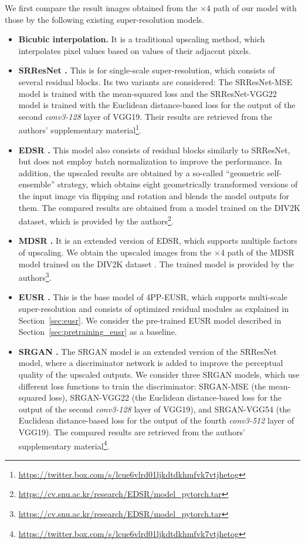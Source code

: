 \documentclass[runningheads]{llncs}
\begin{document}
We first compare the result images obtained from the $\times$4 path of our model with those by the following existing super-resolution models.
\begin{itemize}
	\item \textbf{Bicubic interpolation.}
	It is a traditional upscaling method, which interpolates pixel values based on values of their adjacent pixels.
	
	\item \textbf{SRResNet \cite{ledig2017photo}.}
	This is for single-scale super-resolution, which consists of several residual blocks.
	Its two variants are considered: The SRResNet-MSE model is trained with the mean-squared loss and the SRResNet-VGG22 model is trained with the Euclidean distance-based loss for the output of the second \textit{conv3-128} layer of VGG19.
	Their results are retrieved from the authors' supplementary material\footnote{\url{https://twitter.box.com/s/lcue6vlrd01ljkdtdkhmfvk7vtjhetog}}.
	
	\item \textbf{EDSR \cite{lim2017enhanced}.}
	This model also consists of residual blocks similarly to SRResNet, but does not employ batch normalization to improve the performance.
	In addition, the upscaled results are obtained by a so-called ``geometric self-ensemble'' strategy, which obtains eight geometrically transformed versions of the input image via flipping and rotation and blends the model outputs for them.
	The compared results are obtained from a model trained on the DIV2K dataset, which is provided by the authors\footnote{\url{https://cv.snu.ac.kr/research/EDSR/model\_pytorch.tar}}.
	
	\item \textbf{MDSR \cite{lim2017enhanced}.}
	It is an extended version of EDSR, which supports multiple factors of upscaling.
	We obtain the upscaled images from the $\times$4 path of the MDSR model trained on the DIV2K dataset \cite{timofte2018ntire}.
	The trained model is provided by the authors\footnote{\url{https://cv.snu.ac.kr/research/EDSR/model\_pytorch.tar}}.
	
	\item \textbf{EUSR \cite{kim2018deep}.}
	This is the base model of 4PP-EUSR, which supports multi-scale super-resolution and consists of optimized residual modules as explained in Section~\ref{sec:eusr}.
	We consider the pre-trained EUSR model described in Section~\ref{sec:pretraining_eusr} as a baseline.
	
	\item \textbf{SRGAN \cite{ledig2017photo}.}
	The SRGAN model is an extended version of the SRResNet model, where a discriminator network is added to improve the perceptual quality of the upscaled outputs.
	We consider three SRGAN models, which use different loss functions to train the discriminator: SRGAN-MSE (the mean-squared loss), SRGAN-VGG22 (the Euclidean distance-based loss for the output of the second \textit{conv3-128} layer of VGG19), and SRGAN-VGG54 (the Euclidean distance-based loss for the output of the fourth \textit{conv3-512} layer of VGG19).
	The compared results are retrieved from the authors' supplementary material\footnote{\url{https://twitter.box.com/s/lcue6vlrd01ljkdtdkhmfvk7vtjhetog}}.
	

\end{itemize}
\end{document}
